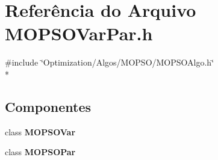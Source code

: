 \section{Referência do Arquivo M\+O\+P\+S\+O\+Var\+Par.\+h}
\label{_m_o_p_s_o_var_par_8h}
{\ttfamily \#include \char`\"{}Optimization/\+Algos/\+M\+O\+P\+S\+O/\+M\+O\+P\+S\+O\+Algo.\+h\char`\"{}}\\*
\subsection*{Componentes}
\begin{DoxyCompactItemize}
\item 
class {\bf M\+O\+P\+S\+O\+Var}
\item 
class {\bf M\+O\+P\+S\+O\+Par}
\end{DoxyCompactItemize}
